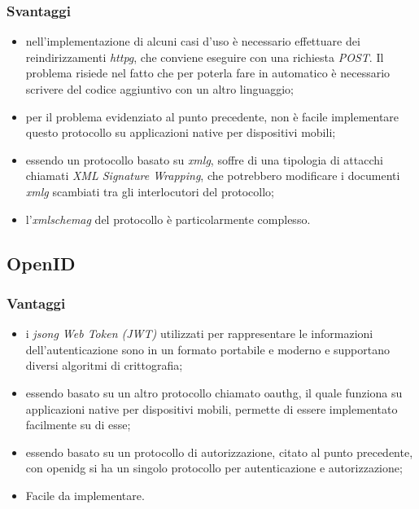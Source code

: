     \subsubsection{Svantaggi}\label{sec:saml_svantaggi}
    \begin{itemize}
        \item nell'implementazione di alcuni casi d'uso è necessario effettuare dei reindirizzamenti \textit{\gls{httpg}}, che conviene eseguire con una richiesta \textit{POST}. Il problema risiede nel fatto che per poterla fare in automatico è necessario scrivere del codice aggiuntivo con un altro linguaggio;
        \item per il problema evidenziato al punto precedente, non è facile implementare questo protocollo su applicazioni native per dispositivi mobili;
        \item essendo un protocollo basato su \textit{\gls{xmlg}}, soffre di una tipologia di attacchi chiamati \textit{XML Signature Wrapping}, che potrebbero modificare i documenti \textit{\gls{xmlg}} scambiati tra gli interlocutori del protocollo;
        \item l'\textit{\gls{xmlschemag}} del protocollo è particolarmente complesso.
    \end{itemize}

\subsection{OpenID}
    \subsubsection{Vantaggi}
    \begin{itemize}
        \setlength\itemsep{0em}
        \item i \textit{\gls{jsong} Web Token (JWT)} utilizzati per rappresentare le informazioni dell'autenticazione sono in un formato portabile e moderno e supportano diversi algoritmi di crittografia;
        \item essendo basato su un altro protocollo chiamato \gls{oauthg}, il quale funziona su applicazioni native per dispositivi mobili, permette di essere implementato facilmente su di esse;
        \item essendo basato su un protocollo di autorizzazione, citato al punto precedente, con \gls{openidg} si ha un singolo protocollo per autenticazione e autorizzazione;
        \item Facile da implementare.
    \end{itemize}
